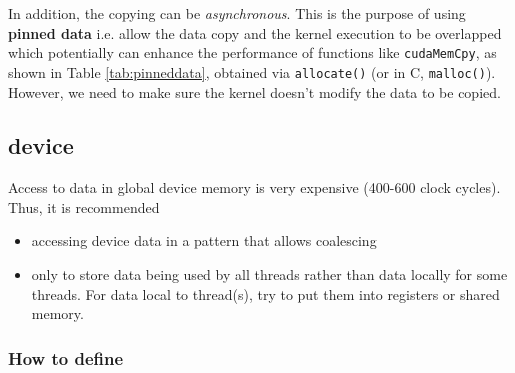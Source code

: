 In addition, the copying can be {\it asynchronous}. This is the
purpose of using {\bf pinned data} i.e. allow the data copy and the
kernel execution to be overlapped which potentially can enhance the
performance of functions like \verb!cudaMemCpy!, as shown in Table
\ref{tab:pinneddata}, obtained via \verb!allocate()!  (or in C,
\verb!malloc()!).  However, we need to make sure the kernel doesn't
modify the data to be copied.



\subsection{device }
\label{sec:device-}

Access to data in global device memory is very expensive (400-600
clock cycles). Thus, it is recommended
\begin{itemize}
\item accessing device data in a pattern that allows coalescing

\item only to store data being used by all threads rather than data
  locally for some threads. For data local to thread(s), try to put
  them into registers or shared memory.
\end{itemize}

\subsubsection{How to define}
\label{sec:how-define-1}

